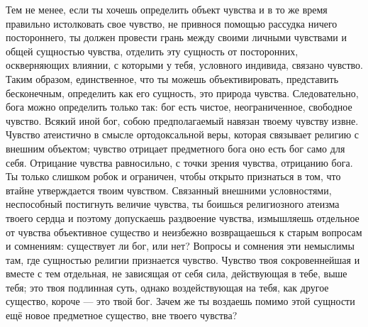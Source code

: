 \documentclass[12pt,oneside]{book}
\begin{document}
Тем не менее, если ты хочешь определить объект чувства и в то же время правильно истолковать свое чувство, не привнося помощью рассудка ничего постороннего, ты должен провести грань между своими личными чувствами и общей сущностью чувства, отделить эту сущность от посторонних, оскверняющих влиянии, с которыми у тебя, условного индивида, связано чувство. Таким образом, единственное, что ты можешь объективировать, представить бесконечным, определить как его сущность, это природа чувства. Следовательно, бога можно определить только так: бог есть чистое, неограниченное, свободное чувство. Всякий иной бог, собою предполагаемый навязан твоему чувству извне. Чувство атеистично в смысле ортодоксальной веры, которая связывает религию с внешним объектом; чувство отрицает предметного бога оно есть бог само для себя. Отрицание чувства равносильно, с точки зрения чувства, отрицанию бога. Ты только слишком робок и ограничен, чтобы открыто признаться в том, что втайне утверждается твоим чувством. Связанный внешними условностями, неспособный постигнуть величие чувства, ты боишься религиозного атеизма твоего сердца и поэтому допускаешь раздвоение чувства, измышляешь отдельное от чувства объективное существо и неизбежно возвращаешься к старым вопросам и сомнениям: существует ли бог, или нет? Вопросы и сомнения эти немыслимы там, где сущностью религии признается чувство. Чувство твоя сокровеннейшая и вместе с тем отдельная, не зависящая от себя сила, действующая в тебе, выше тебя; это твоя подлинная суть, однако воздействующая на тебя, как другое существо, короче --- это твой бог. Зачем же ты воздаешь помимо этой сущности ещё новое предметное существо, вне твоего чувства?
\end{document}
